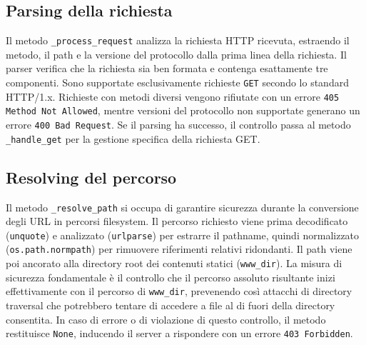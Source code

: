 \documentclass[a4paper,12pt]{report}
\begin{document}
\subsection{Parsing della richiesta}
Il metodo \texttt{\_process\_request} analizza la richiesta HTTP ricevuta, estraendo il metodo, il path e la versione del protocollo dalla prima linea della richiesta. Il parser verifica che la richiesta sia ben formata e contenga esattamente tre componenti. Sono supportate esclusivamente richieste \texttt{GET} secondo lo standard HTTP/1.x. Richieste con metodi diversi vengono rifiutate con un errore \texttt{405 Method Not Allowed}, mentre versioni del protocollo non supportate generano un errore \texttt{400 Bad Request}. Se il parsing ha successo, il controllo passa al metodo \texttt{\_handle\_get} per la gestione specifica della richiesta GET.

\subsection{Resolving del percorso}
Il metodo \texttt{\_resolve\_path} si occupa di garantire sicurezza durante la conversione degli URL in percorsi filesystem. Il percorso richiesto viene prima decodificato (\texttt{unquote}) e analizzato (\texttt{urlparse}) per estrarre il pathname, quindi normalizzato (\texttt{os.path.normpath}) per rimuovere riferimenti relativi ridondanti. Il path viene poi ancorato alla directory root dei contenuti statici (\texttt{www\_dir}). La misura di sicurezza fondamentale è il controllo che il percorso assoluto risultante inizi effettivamente con il percorso di \texttt{www\_dir}, prevenendo così attacchi di directory traversal che potrebbero tentare di accedere a file al di fuori della directory consentita. In caso di errore o di violazione di questo controllo, il metodo restituisce \texttt{None}, inducendo il server a rispondere con un errore \texttt{403 Forbidden}.
\end{document}
